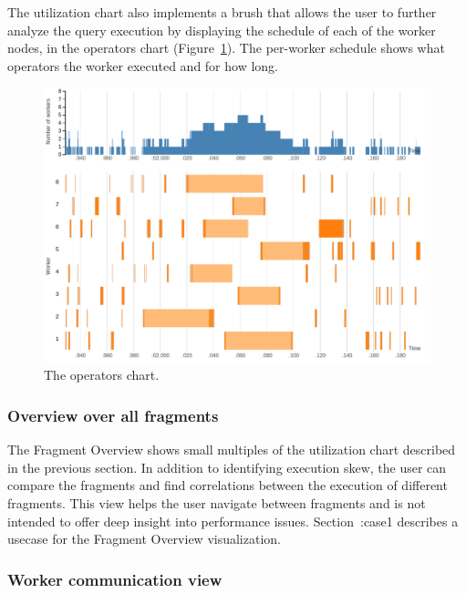 \documentclass{chi2009}
\newcommand*{\overall}{Fragment Overview\xspace}
\begin{document}
The utilization chart also implements a brush that allows the user to further
analyze the query execution by displaying the schedule of each of the worker
nodes, in the operators chart (Figure~\ref{fig:operators_chart}). The per-worker
schedule shows what operators the worker executed and for how long.

\begin{figure}[ht]
  \includegraphics[width=\columnwidth]{images/operators_chart}
  \caption{The operators chart.}
  \label{fig:operators_chart}
\end{figure}

\subsubsection{Overview over all fragments}
\label{sec:overview}


The \overall shows small multiples of the utilization chart described in the previous section.
In addition to identifying execution skew, the user can compare the fragments and find
correlations between the execution of different fragments. This view helps the user navigate between 
fragments and is not intended to offer deep insight into performance issues. Section~{\sec:case1} describes
a usecase for the \overall visualization.


\subsubsection{Worker communication view}
\end{document}
